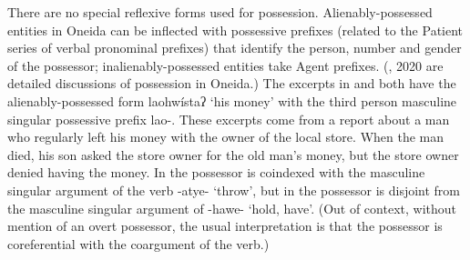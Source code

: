 \documentclass[output=paper]{langscibook}
\begin{document}
 
There are no special reflexive forms used for possession. Alienably-possessed entities in Oneida can be inflected with possessive prefixes (related to the Patient series of verbal pronominal prefixes) that identify the person, number and gender of the possessor; inalienably-possessed entities take Agent prefixes. (\citealt{KoenigMichelson2019}, 2020 are detailed discussions of possession in Oneida.) The excerpts in  and  both have the alienably-possessed form {laohwístaʔ} ‘his money’ with the third person masculine singular possessive prefix {lao-}. These excerpts come from a report about a man who regularly left his money with the owner of the local store. When the man died, his son asked the store owner for the old man’s money, but the store owner denied having the money. In  the possessor is coindexed with the masculine singular argument of the verb {-atye-} ‘throw’, but in  the possessor is disjoint from the masculine singular argument of {-hawe-} ‘hold, have’. (Out of context, without mention of an overt possessor, the usual interpretation is that the possessor is coreferential with the coargument of the verb.)

  
    
\end{document}

